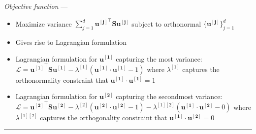 \emph{Objective function} ---
\begin{itemize}
    \item Maximize variance $\sum_{j=1}^d \boldsymbol{u^{[j]}}^\intercal \boldsymbol{S} \boldsymbol{u^{[j]}}$ subject to orthonormal $\{\boldsymbol{u^{[j]}}\}_{j=1}^d$
    \item Gives rise to Lagrangian formulation
    \item Lagrangian formulation for $\boldsymbol{u^{[1]}}$ capturing the most variance: $\mathcal{L} = \boldsymbol{u^{[1]}}^\intercal \boldsymbol{S} \boldsymbol{u^{[1]}} - \lambda^{[1]} (\boldsymbol{u^{[1]}} \cdot \boldsymbol{u^{[1]}} - 1)$ where $\lambda^{[1]}$ captures the orthonormality constraint that $\boldsymbol{u^{[1]}} \cdot \boldsymbol{u^{[1]}} = 1$
    \item Lagrangian formulation for $\boldsymbol{u^{[2]}}$ capturing the secondmost variance: $\mathcal{L} = \boldsymbol{u^{[2]}}^\intercal \boldsymbol{S} \boldsymbol{u^{[2]}} - \lambda^{[2]} (\boldsymbol{u^{[2]}} \cdot \boldsymbol{u^{[2]}} - 1) - \lambda^{[1][2]} (\boldsymbol{u^{[1]}} \cdot \boldsymbol{u^{[2]}} - 0)$ where $\lambda^{[1][2]}$ captures the orthogonality constraint that $\boldsymbol{u^{[1]}} \cdot \boldsymbol{u^{[2]}} = 0$
\end{itemize}

{\color{lightgray}\hrule height 0.001mm}

